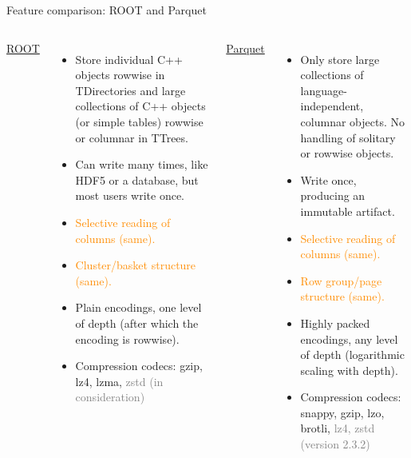 \documentclass[aspectratio=169]{beamer}
\begin{document}
\begin{frame}{Feature comparison: ROOT and Parquet}
\vspace{0.5 cm}
\begin{columns}[t]
{\large \underline{ROOT}}

\begin{itemize}
\item Store individual C++ objects rowwise in TDirectories and large collections of C++ objects (or simple tables) rowwise or columnar in TTrees.
\item Can write many times, like HDF5 or a database, but most users write once.
\item \textcolor{darkorange}{Selective reading of columns (same).}
\item \textcolor{darkorange}{Cluster/basket structure (same).}
\item Plain encodings, one level of depth (after which the encoding is rowwise).
\item Compression codecs: gzip, lz4, lzma, \textcolor{gray}{zstd (in consideration)}
\end{itemize}

{\large \underline{Parquet}}

\begin{itemize}
\item Only store large collections of language-independent, columnar objects. No handling of solitary or rowwise objects.
\item Write once, producing an immutable artifact.
\item \textcolor{darkorange}{Selective reading of columns (same).}
\item \textcolor{darkorange}{Row group/page structure (same).}
\item Highly packed encodings, any level of depth (logarithmic scaling with depth).
\item Compression codecs: snappy, gzip, lzo, brotli, \textcolor{gray}{lz4, zstd (version 2.3.2)}
\end{itemize}
\end{columns}
\end{frame}
\end{document}
